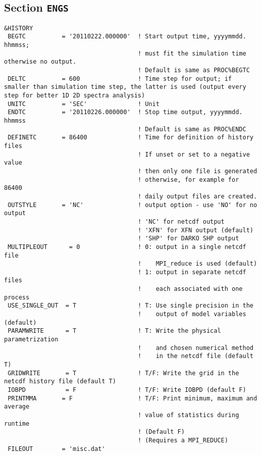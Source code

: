 \documentclass[12pt]{amsart}
\begin{document}
\subsection{Section {\tt ENGS}}
\begin{verbatim}
&HISTORY
 BEGTC          = '20110222.000000'  ! Start output time, yyyymmdd. hhmmss;
                                     ! must fit the simulation time otherwise no output.
                                     ! Default is same as PROC%BEGTC
 DELTC          = 600                ! Time step for output; if smaller than simulation time step, the latter is used (output every step for better 1D 2D spectra analysis)
 UNITC          = 'SEC'              ! Unit
 ENDTC          = '20110226.000000'  ! Stop time output, yyyymmdd. hhmmss
                                     ! Default is same as PROC%ENDC
 DEFINETC       = 86400              ! Time for definition of history files
                                     ! If unset or set to a negative value
                                     ! then only one file is generated
                                     ! otherwise, for example for 86400
                                     ! daily output files are created.
 OUTSTYLE       = 'NC'               ! output option - use 'NO' for no output
                                     ! 'NC' for netcdf output
                                     ! 'XFN' for XFN output (default)
                                     ! 'SHP' for DARKO SHP output
 MULTIPLEOUT      = 0                ! 0: output in a single netcdf file
                                     !    MPI_reduce is used (default)
                                     ! 1: output in separate netcdf files
                                     !    each associated with one process
 USE_SINGLE_OUT  = T                 ! T: Use single precision in the
                                     !    output of model variables (default)
 PARAMWRITE      = T                 ! T: Write the physical parametrization
                                     !    and chosen numerical method
                                     !    in the netcdf file (default T)
 GRIDWRITE       = T                 ! T/F: Write the grid in the netcdf history file (default T)
 IOBPD           = F                 ! T/F: Write IOBPD (default F)
 PRINTMMA       = F                  ! T/F: Print minimum, maximum and average
                                     ! value of statistics during runtime
                                     ! (Default F)
                                     ! (Requires a MPI_REDUCE)
 FILEOUT        = 'misc.dat'

\end{verbatim}
\end{document}
